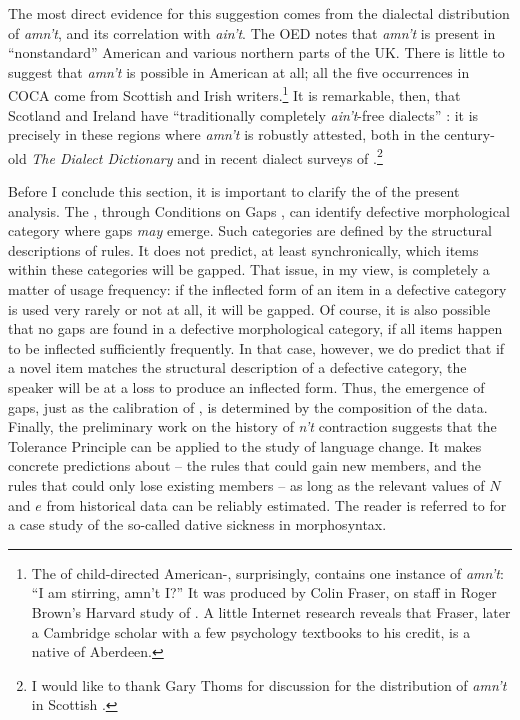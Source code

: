 \documentclass[output=paper,
modfonts
]{LSP/langsci}
\begin{document}
The most direct evidence for this suggestion comes from the 
dialectal distribution of \textit{amn't}, and its correlation with \textit{ain't}. 
The OED notes that \textit{amn't} is present in ``nonstandard'' American  and various northern
parts of the UK. There is little to suggest that \textit{amn't} is
possible in American  at all;  all the five occurrences in COCA
come from Scottish and Irish writers.\footnote{ The  of child-directed
American-,  surprisingly, contains one instance 
of \textit{amn't}: ``I am stirring, amn't I?'' It was produced by Colin Fraser,
on staff in Roger Brown's Harvard study of 
\citeyearpar{Brown1973a}. A little Internet research reveals that Fraser, later a
Cambridge scholar with a few psychology textbooks to his credit, is a
native of Aberdeen.} It is 
remarkable, then,  that 
 Scotland and Ireland have ``traditionally completely \textit{ain't}-free dialects'' \citep[520]{Anderwald2003a}: it is
precisely in these regions where \textit{amn't} is robustly attested,
both in the century-old \textit{The 
  Dialect Dictionary} \citep{Wright1898} and in recent dialect
surveys of  \citep{Anderwald2003}.\footnote{I would like to thank Gary Thoms for
  discussion for the distribution of \textit{amn't} in Scottish .}


Before I conclude this section, it is important to clarify the  of the present
analysis. The , through  Conditions on
Gaps , can identify defective morphological
category where gaps \textit{may} emerge. Such categories are defined 
 by the structural descriptions of rules. It does not predict, at
 least synchronically, 
which items within these categories will be gapped. That issue,  in my view,
is completely a matter of usage frequency: if the inflected form of an
item in a defective category is used very  rarely or not at all, it will be gapped.  Of
course, it is also possible that no gaps are found in a defective
morphological category, if 
all items happen to be inflected sufficiently frequently. In that
case, however, we do predict that if a novel item 
 matches the structural description of a defective category, the speaker
will be at a loss to produce an inflected form.  Thus, the emergence
of gaps, just as the calibration of ,  is 
determined by the composition of the  data. 
Finally, the preliminary work on the history of \textit{n't} contraction
suggests that the Tolerance 
Principle can be applied to the study of language change. It makes
concrete predictions about  -- the rules that could 
gain new members, and the rules that could  only lose existing
members -- as long as the relevant values of $N$ and $e$ from
historical data can be reliably estimated. The reader is referred to
\citealt{POP} for a case study of  the so-called
  dative sickness in  morphosyntax.
\end{document}
